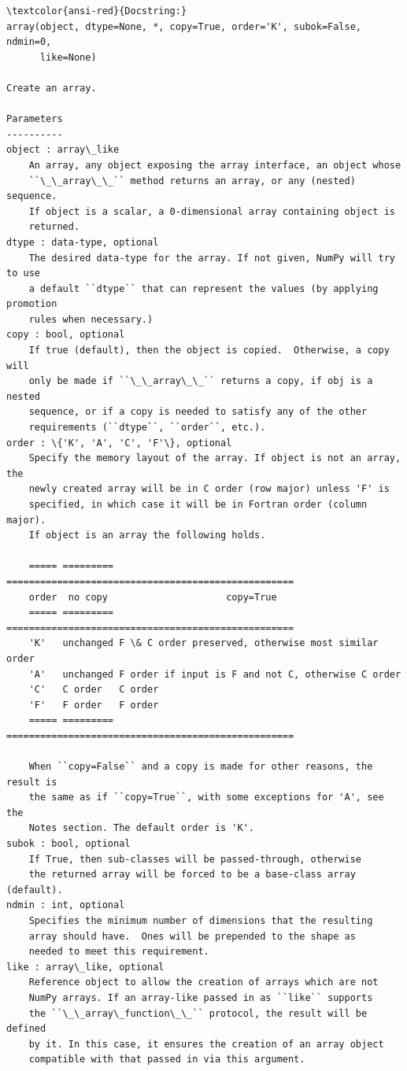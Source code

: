 \documentclass[11pt]{article}
\begin{document}
    
    \begin{Verbatim}[commandchars=\\\{\}]
\textcolor{ansi-red}{Docstring:}
array(object, dtype=None, *, copy=True, order='K', subok=False, ndmin=0,
      like=None)

Create an array.

Parameters
----------
object : array\_like
    An array, any object exposing the array interface, an object whose
    ``\_\_array\_\_`` method returns an array, or any (nested) sequence.
    If object is a scalar, a 0-dimensional array containing object is
    returned.
dtype : data-type, optional
    The desired data-type for the array. If not given, NumPy will try to use
    a default ``dtype`` that can represent the values (by applying promotion
    rules when necessary.)
copy : bool, optional
    If true (default), then the object is copied.  Otherwise, a copy will
    only be made if ``\_\_array\_\_`` returns a copy, if obj is a nested
    sequence, or if a copy is needed to satisfy any of the other
    requirements (``dtype``, ``order``, etc.).
order : \{'K', 'A', 'C', 'F'\}, optional
    Specify the memory layout of the array. If object is not an array, the
    newly created array will be in C order (row major) unless 'F' is
    specified, in which case it will be in Fortran order (column major).
    If object is an array the following holds.

    ===== ========= ===================================================
    order  no copy                     copy=True
    ===== ========= ===================================================
    'K'   unchanged F \& C order preserved, otherwise most similar order
    'A'   unchanged F order if input is F and not C, otherwise C order
    'C'   C order   C order
    'F'   F order   F order
    ===== ========= ===================================================

    When ``copy=False`` and a copy is made for other reasons, the result is
    the same as if ``copy=True``, with some exceptions for 'A', see the
    Notes section. The default order is 'K'.
subok : bool, optional
    If True, then sub-classes will be passed-through, otherwise
    the returned array will be forced to be a base-class array (default).
ndmin : int, optional
    Specifies the minimum number of dimensions that the resulting
    array should have.  Ones will be prepended to the shape as
    needed to meet this requirement.
like : array\_like, optional
    Reference object to allow the creation of arrays which are not
    NumPy arrays. If an array-like passed in as ``like`` supports
    the ``\_\_array\_function\_\_`` protocol, the result will be defined
    by it. In this case, it ensures the creation of an array object
    compatible with that passed in via this argument.


\end{Verbatim}
\end{document}
